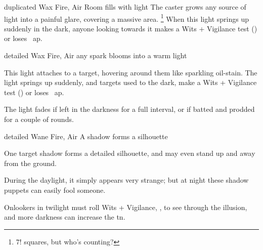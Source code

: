   {duplicated}%
  {Wax}%
  {Fire, Air}%
  {}%
  {Room fills with light}%
  {
    The caster grows any source of light into a painful glare, covering a massive area.%
    \footnote{$7!$ squares, but who's counting?}
    When this light springs up suddenly in the dark, anyone looking towards it makes a Wits + Vigilance test (\tn[9]) or loses ~\gls{ap}.
  }

  {detailed}%
  {Wax}%
  {Fire, Air}%
  {}%
  {any spark blooms into a warm light}%
  {
    This light attaches to a target, hovering around them like sparkling oil-stain.
    The light springs up suddenly, and targets used to the dark, make a Wits + Vigilance test (\tn[9]) or loses ~\gls{ap}.

    The light fades if left in the darkness for a full \gls{interval}, or if batted and prodded for a couple of rounds.
  }

  {detailed}%
  {Wane}%
  {Fire, Air}%
  {}%
  {A shadow forms a silhouette}%
  {
    One target shadow forms a detailed silhouette, and may even stand up and away from the ground.

    During the daylight, it simply appears very strange; but at night these shadow puppets can easily fool someone.

    \setcounter{track}{\value{spellCost}}
    \addtocounter{track}{7}
    Onlookers in twilight must roll Wits + Vigilance, , to see through the illusion, and more darkness can increase the \gls{tn}.
  }

